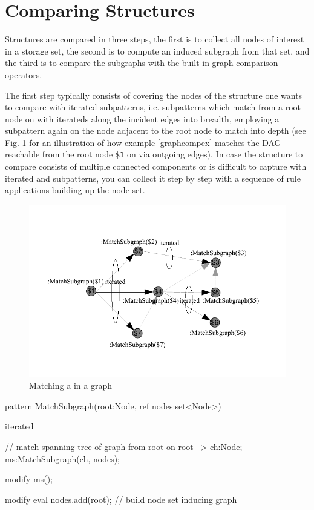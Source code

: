 \section{Comparing Structures}\label{subsub:comparestructure}
Structures are compared in three steps, the first is to collect all nodes of interest in a storage set, the second is to compute an induced subgraph from that set, and the third is to compare the subgraphs with the built-in graph comparison operators.

The first step typically consists of covering the nodes of the structure one wants to compare with iterated subpatterns,
i.e. subpatterns which match from a root node on with iterateds along the incident edges into breadth,
employing a subpattern again on the node adjacent to the root node to match into depth (see Fig. \ref{figspanningtree} for an illustration of how example \ref{graphcompex} matches the DAG reachable from the root node \verb#$1# on via outgoing edges).
In case the structure to compare consists of multiple connected components or is difficult to capture with iterated and subpatterns, you can collect it step by step with a sequence of rule applications building up the node set.

\begin{figure}[htbp]
  \centering
  \includegraphics[width=\textwidth]{fig/SpanningTree}
  \caption{Matching a  in a graph}
  \label{figspanningtree}
\end{figure}

  \begin{example}\label{graphcompex}
    \begin{grgen}
pattern MatchSubgraph(root:Node, ref nodes:set<Node>)
{
  iterated { // match spanning tree of graph from root on
    root --> ch:Node;
    ms:MatchSubgraph(ch, nodes);

    modify {
      ms();
    }
  }

  modify {
    eval { nodes.add(root); } // build node set inducing graph
  }
}
    \end{grgen}
  \end{example}

